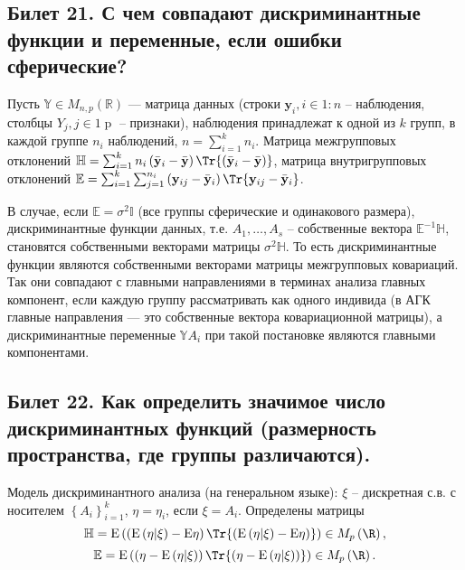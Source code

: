 
%   
% 


\subsection{Билет 21. С чем совпадают дискриминантные функции и переменные, если ошибки сферические?}

	Пусть $\mathbb Y \in M_{n, p}\left(\mathbb R\right)$ --- матрица данных (строки $\mathbf y_i, i \in 1\mathbin : n$ -- наблюдения, столбцы $Y_j, j\in 1\mathbin p$ -- признаки), 
	наблюдения принадлежат к одной из $k$ групп, 
	в каждой группе $n_i$ наблюдений, $n = \sum_{i=1}^k n_i$. %
	Матрица межгрупповых отклонений $\mathbb H = \sum_{i=1}^k n_i\left(\bar{\mathbf y}_i - \bar{\mathbf y}\right)\Tr{\left(\bar{\mathbf y}_i - \bar{\mathbf y}\right)}$, 
	матрица внутригрупповых отклонений $\mathbb E = \sum_{i=1}^k\sum_{j=1}^{n_i} \left(\mathbf y_{ij} - \bar{\mathbf y}_i\right)\Tr{\mathbf y_{ij} - \bar{\mathbf y}_i}$.

	В случае, если $\mathbb E = \sigma^2\mathbb I$ (все группы сферические и одинакового размера), дискриминантные функции данных, т.е. $A_1, \ldots, A_s$ -- собственные вектора $\mathbb E^{-1}\mathbb H$, становятся собственными векторами матрицы $\sigma^2\mathbb H$. То есть дискриминантные функции являются собственными векторами матрицы межгрупповых ковариаций. Так они совпадают с главными направлениями в терминах анализа главных компонент, если каждую группу рассматривать как одного индивида (в АГК главные направления --- это собственные вектора ковариационной матрицы), а дискриминантные переменные $\mathbb Y A_i$ при такой постановке являются главными компонентами.

\subsection{Билет 22. Как определить значимое число дискриминантных функций (размерность пространства, где группы различаются).}

	Модель дискриминантного анализа (на генеральном языке): $\xi$ -- дискретная с.в. с носителем $\left\lbrace A_i\right\rbrace_{i=1}^k$, $\eta = \eta_i$, если $\xi = A_i$. Определены матрицы
	$$\mathbb H = \mathrm E\left(\left(\mathrm E\left(\eta\middle\vert\xi\right) - \mathrm E\eta\right)\Tr{\left(\mathrm E\left(\eta\middle\vert\xi\right) - \mathrm E\eta\right)}\right) \in M_p\left(\R\right),$$
	$$\mathbb E = \mathrm E\left(\left(\eta - \mathrm E\left(\eta\middle\vert\xi\right)\right)\Tr{\left(\eta - \mathrm E\left(\eta\middle\vert\xi\right)\right)}\right) \in M_p\left(\R\right).$$

